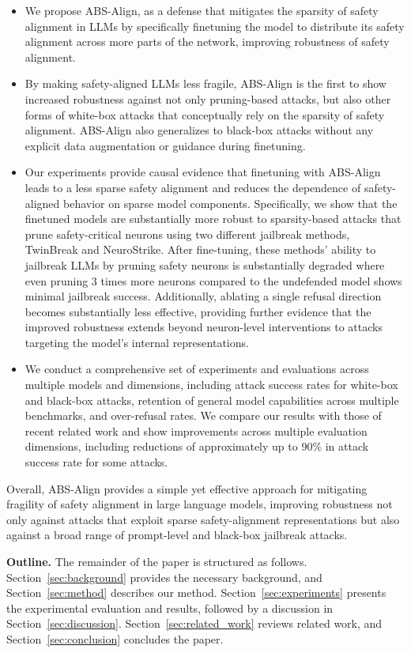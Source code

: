 \begin{itemize}
    
    \item We propose ABS-Align, as a defense that mitigates the sparsity of safety alignment in LLMs by specifically finetuning the model to distribute its safety alignment across more parts of the network, improving robustness of safety alignment.
    
    \item By making safety-aligned LLMs less fragile, ABS-Align is the first to show increased robustness against not only pruning-based attacks, but also other forms of white-box attacks that conceptually rely on the sparsity of safety alignment. ABS-Align also generalizes to black-box attacks without any explicit data augmentation or guidance during finetuning.

    \item Our experiments provide causal evidence that finetuning with ABS-Align leads to a less sparse safety alignment and reduces the dependence of safety-aligned behavior on sparse model components. Specifically, we show that the finetuned models are substantially more robust to sparsity-based attacks that prune safety-critical neurons using two different jailbreak methods, TwinBreak and NeuroStrike. After fine-tuning, these methods' ability to jailbreak LLMs by pruning safety neurons is substantially degraded where even pruning 3 times more neurons compared to the undefended model shows minimal jailbreak success. Additionally, ablating a single refusal direction becomes substantially less effective, providing further evidence that the improved robustness extends beyond neuron-level interventions to attacks targeting the model's internal representations.


    \item We conduct a comprehensive set of experiments and evaluations across multiple models and dimensions, including attack success rates for white-box and black-box attacks, retention of general model capabilities across multiple benchmarks, and over-refusal rates. We compare our results with those of recent related work and show improvements across multiple evaluation dimensions, including reductions of approximately up to 90\% in attack success rate for some attacks.
\end{itemize}

Overall, ABS-Align provides a simple yet effective approach for mitigating fragility of safety alignment in large language models, improving robustness not only against attacks that exploit sparse safety-alignment representations but also against a broad range of prompt-level and black-box jailbreak attacks.



\textbf{Outline.} The remainder of the paper is structured as follows. Section~\ref{sec:background} provides the necessary background, and Section~\ref{sec:method} describes our method. Section~\ref{sec:experiments} presents the experimental evaluation and results, followed by a discussion in Section~\ref{sec:discussion}. Section~\ref{sec:related_work} reviews related work, and Section~\ref{sec:conclusion} concludes the paper.